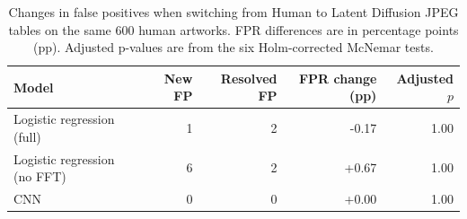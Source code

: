 \begin{table}[tb]
\centering
\small
\caption{Changes in false positives when switching from Human to Latent Diffusion JPEG tables on the same 600 human artworks. FPR differences are in percentage points (pp). Adjusted p-values are from the six Holm-corrected McNemar tests.}
\label{tab:jpeg-intervention}
\begin{tabular}{lrrrr}
\hline
Model & New FP & Resolved FP & FPR change (pp) & Adjusted $p$ \\
\hline
Logistic regression (full) & 1 & 2 & -0.17 & 1.00 \\
Logistic regression (no FFT) & 6 & 2 & +0.67 & 1.00 \\
CNN & 0 & 0 & +0.00 & 1.00 \\
\hline
\end{tabular}
\end{table}
